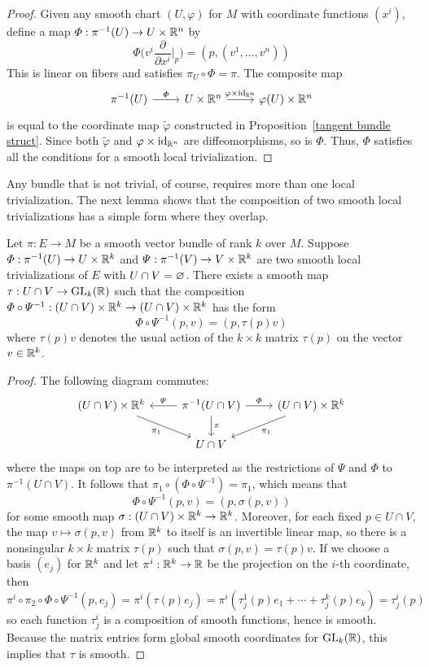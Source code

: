 \begin{proof}
Given any smooth chart $(U,\varphi)$ for $M$ with coordinate functions $(x^i)$, define a map $\varPhi:\pi^{-1}(U)\to U\times\mathbb{R}^n$ by
\[\varPhi\Big(v^i\frac{\partial}{\partial x^i}\Big|_p\Big)=(p,(v^1,\dots,v^n))\]
This is linear on fibers and satisfies $\pi_U\circ\varPhi=\pi$. The composite map
\[\begin{tikzcd}
\pi^{-1}(U)\ar[r,"\varPhi"]&U\times\R^n\ar[r,"\varphi\times\mathrm{id}_{\R^n}"]&\varphi(U)\times\R^n
\end{tikzcd}\]
is equal to the coordinate map $\widetilde{\varphi}$ constructed in Proposition~\ref{tangent bundle struct}. Since both $\widetilde{\varphi}$ and $\varphi\times\mathrm{id}_{\mathbb{R}^n}$ are diffeomorphisms, so is $\varPhi$. Thus, $\varPhi$ satisfies all the conditions for a smooth local trivialization.
\end{proof}
Any bundle that is not trivial, of course, requires more than one local trivialization. The next lemma shows that the composition of two smooth local trivializations has a simple form where they overlap.
\begin{lemma}\label{vector bundle trivialization overlap}
Let $\pi:E\to M$ be a smooth vector bundle of rank $k$ over $M$. Suppose $\varPhi:\pi^{-1}(U)\to U\times\mathbb{R}^k$ and $\varPsi:\pi^{-1}(V)\to V\times\mathbb{R}^k$ are two smooth local trivializations of $E$ with $U\cap V=\varnothing$. There exists a smooth map $\tau:U\cap V\to\mathrm{GL}_k(\mathbb{R})$ such that the composition $\varPhi\circ\varPsi^{-1}:(U\cap V)\times\mathbb{R}^k\to(U\cap V)\times\mathbb{R}^k$ has the form
\[\varPhi\circ\varPsi^{-1}(p,v)=(p,\tau(p)v)\]
where $\tau(p)v$ denotes the usual action of the $k\times k$ matrix $\tau(p)$ on the vector $v\in\mathbb{R}^k$.
\end{lemma}
\begin{proof}
The following diagram commutes:
\[\begin{tikzcd}
(U\cap V)\times\R^k\ar[rd,swap,"\pi_1"]&\pi^{-1}(U\cap V)\ar[l,swap,"\varPsi"]\ar[r,"\varPhi"]\ar[d,"\pi"]&(U\cap V)\times\R^k\ar[ld,"\pi_1"]\\
&U\cap V&
\end{tikzcd}\]
where the maps on top are to be interpreted as the restrictions of $\varPsi$ and $\varPhi$ to $\pi^{-1}(U\cap V)$. It follows that $\pi_1\circ(\varPhi\circ\varPsi^{-1})=\pi_1$, which means that
\[\varPhi\circ\varPsi^{-1}(p,v)=(p,\sigma(p,v))\]
for some smooth map $\sigma:(U\cap V)\times\mathbb{R}^k\to\mathbb{R}^k$. Moreover, for each fixed $p\in U\cap V$, the map $v\mapsto\sigma(p,v)$ from $\mathbb{R}^k$ to itself is an invertible linear map, so there is a nonsingular $k\times k$ matrix $\tau(p)$ such that $\sigma(p,v)=\tau(p)v$. If we choose a basis $(e_j)$ for $\mathbb{R}^k$ and let $\pi^i:\mathbb{R}^k\to\mathbb{R}$ be the projection on the $i$-th coordinate, then
\[\pi^i\circ\pi_2\circ\varPhi\circ\varPsi^{-1}(p,e_j)=\pi^i(\tau(p)e_j)=\pi^i(\tau^1_j(p)e_1+\cdots+\tau^k_j(p)e_k)=\tau^i_j(p)\]
so each function $\tau^i_j$ is a composition of smooth functions, hence is smooth. Because the matrix entries form global smooth coordinates for $\mathrm{GL}_k(\mathbb{R})$, this implies that $\tau$ is smooth.
\end{proof}
